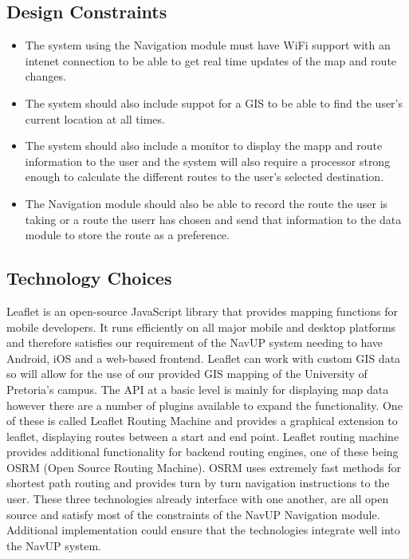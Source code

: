 \documentclass[a4paper, 12pt, one column]{article}
\begin{document}
\subsection{Design Constraints}
\begin{itemize}

      \item The system using the Navigation module must have WiFi support with an intenet connection to be able to get real time updates of the map and route changes.
      \item The system should also include suppot for a GIS to be able to find the user's current location at all times.
       \item The system should also include a monitor to display the mapp and route information to the user and the system will also require a processor strong enough to calculate the different routes to the user's selected destination.
        \item The Navigation module should also be able to record the route the user is taking or a route the userr has chosen and send that information to the data module to store the route as a preference.
      
  \end{itemize}

\subsection{Technology Choices}
Leaflet is an open-source JavaScript library that provides mapping functions for mobile developers. It runs efficiently on all major mobile and desktop platforms and therefore satisfies our requirement of the NavUP system needing to have Android, iOS and a web-based frontend. Leaflet can work with custom GIS data so will allow for the use of our provided GIS mapping of the University of Pretoria’s campus. The API at a basic level is mainly for displaying map data however there are a number of plugins available to expand the functionality. One of these is called Leaflet Routing Machine and provides a graphical extension to leaflet, displaying routes between a start and end point. Leaflet routing machine provides additional functionality for backend routing engines, one of these being OSRM (Open Source Routing Machine). OSRM uses extremely fast methods for shortest path routing and provides turn by turn navigation instructions to the user. These three technologies already interface with one another, are all open source and satisfy most of the constraints of the NavUP Navigation module. Additional implementation could ensure that the technologies integrate well into the NavUP system.
\end{document}
